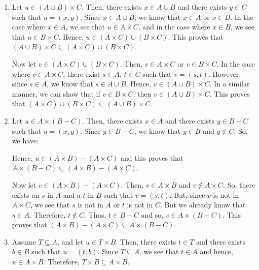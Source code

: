 \begin{enumerate}
\item Let  $u \in \left( {A \cup B} \right) \times C$. Then, there exists $x \in A \cup B$ and there exists  $y \in C$ such that  $u = \left( {x, y} \right)$.  Since  $x \in A \cup B$, we know that  $x \in A$  or  $x \in B$.  In the case where $x \in A$, we see that $u \in A \times C$, and in the case where $x \in B$, we see that $u \in B \times C$.  Hence, 
$u \in \left( A \times C \right) \cup \left( B \times C \right)$.  This proves that 
$\left( {A \cup B} \right) \times C \subseteq \left( {A \times C} \right) \cup \left( {B \times C} \right)$.

Now let $v \in \left( {A \times C} \right) \cup \left( {B \times C} \right)$.  Then, 
$v \in A \times C$ or $v \in B \times C$.  In the case where $v \in A \times C$, there exist 
$s \in A$, $t \in C$ such that $v = \left( s, t \right)$.  However, since $s \in A$, we know that $s \in A \cup B$.  Hence, $v \in \left( A \cup B \right) \times C$.  In a similar manner, we can show that if $v \in B \times C$, then $v \in \left( A \cup B \right) \times C$.  This proves that 
$\left( {A \times C} \right) \cup \left( {B \times C} \right) \subseteq \left( {A \cup B} \right) \times C$.

\item Let $u \in A \times \left( {B - C} \right)$. Then, there exists $x \in A$ and there exists  $y \in B - C$ such that  $u = \left( {x, y} \right)$.  Since  $y \in B - C$, we know that  
$y \in B$ and  $y \notin C$.  So,  we have:
Hence, $u \in \left( A \times B \right) - \left( A \times C \right)$ and this proves that 
$A \times \left( {B - C} \right) \subseteq \left( A \times B \right) - \left( A \times C \right)$.

Now let $v \in \left( A \times B \right) - \left( A \times C \right)$.  Then, 
$v \in A \times B$ and $v \notin A \times C$.  So, there exists an $s$ in $A$ and a $t$ in $B$ such that $v = \left( s, t \right)$.  But, since $v$ is not in $A \times C$, we see that $s$ is not in $A$ or $t$ is not in $C$.  But we already know that $s \in A$.  Therefore, $t \notin C$.  Thus, $t \in B - C$ and so, $v \in A \times \left( B - C \right)$.  This proves that 
$\left( A \times B \right) - \left( A \times C \right) \subseteq A \times \left( B - C \right)$.

\item Assume $T \subseteq A$, and let $u \in T \times B$.  Then, there exists $t \in T$ and there exists $b \in B$ such that $u = \left( t, b \right)$.  Since $T \subseteq A$, we see that 
$t \in A$ and hence, $u \in A \times B$.  Therefore, $T \times B \subseteq A \times B$.


\end{enumerate}
